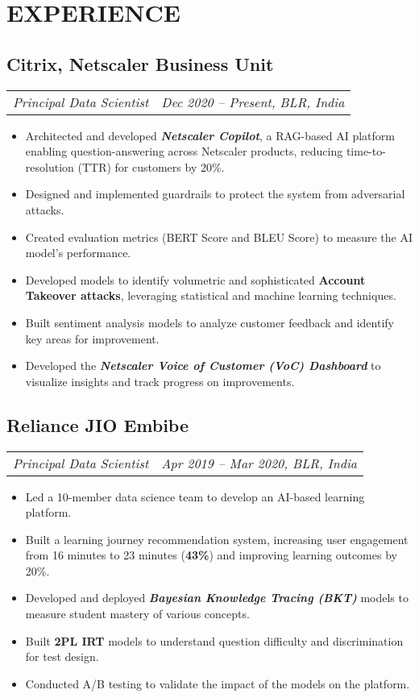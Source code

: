 \documentclass[11pt,a4paper]{moderncv}
\newcommand*{\experienceentry}[5][1mm]{
    \subsection{#2} \vspace{-1.5mm}
    \small{
    \begin{tabularx}{\textwidth}{LR}
        {\itshape #3} & {\itshape #4, #5}
    \end{tabularx}
    }
    \par\addvspace{#1}
}
\begin{document}
\maketitle
\vspace{-10.0mm}

\begin{minipage}[t]{0.64\textwidth}
\section{EXPERIENCE}

\experienceentry{Citrix, Netscaler Business Unit}{Principal Data Scientist}{Dec 2020 -- Present}{BLR, India}
\vspace{-5mm}
\begin{small}
\begin{itemize}
    \item Architected and developed \textbf{\textit{Netscaler Copilot}}, a RAG-based AI platform enabling question-answering across Netscaler products, reducing time-to-resolution (TTR) for customers by 20\%.
    \item Designed and implemented guardrails to protect the system from adversarial attacks.
    \item Created evaluation metrics (BERT Score and BLEU Score) to measure the AI model’s performance.
    \item Developed models to identify volumetric and sophisticated \textbf{Account Takeover attacks}, leveraging statistical and machine learning techniques.
    \item Built sentiment analysis models to analyze customer feedback and identify key areas for improvement.
    \item Developed the \textbf{\textit{Netscaler Voice of Customer (VoC) Dashboard}} to visualize insights and track progress on improvements.
\end{itemize}
\end{small}

\vspace{0.25mm}

\experienceentry{Reliance JIO Embibe}{Principal Data Scientist}{Apr 2019 -- Mar 2020}{BLR, India}
\vspace{-5mm}
\begin{itemize}
    \item Led a 10-member data science team to develop an AI-based learning platform.
    \item Built a learning journey recommendation system, increasing user engagement from 16 minutes to 23 minutes (\textbf{43\%}) and improving learning outcomes by 20\%.
    \item Developed and deployed \textbf{\textit{Bayesian Knowledge Tracing (BKT)}} models to measure student mastery of various concepts.
    \item Built \textbf{2PL IRT} models to understand question difficulty and discrimination for test design.
    \item Conducted A/B testing to validate the impact of the models on the platform.
\end{itemize}
\vspace{0.25mm}


\end{minipage}
\end{document}
